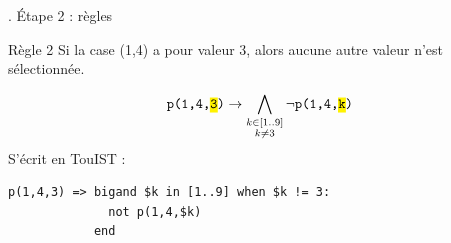 \documentclass[english,french,usenames,dvipsnames]{beamer}
\begin{document}
\begin{frame}[containsverbatim]{\subsecname. Étape 2 : règles}
\begin{exampleblock}{Règle 2}
Si la case (1,4) a pour valeur 3, alors aucune autre valeur n'est sélectionnée.
\end{exampleblock}
\[\texttt{p(1,4,\hl{3})} \rightarrow \bigwedge_{\substack{k\in [1..9] \\ k\neq 3}} \neg \texttt{p(1,4,\hl{k})} \]
S'écrit en TouIST :
\begin{verbatim}
p(1,4,3) => bigand $k in [1..9] when $k != 3:
              not p(1,4,$k)
            end
\end{verbatim}
\end{frame}



\begin{frame}
\end{frame}

\begin{frame}
\end{frame}
\end{document}
